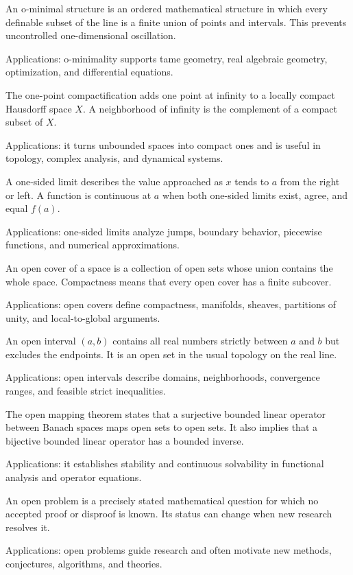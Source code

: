 An o-minimal structure is an ordered mathematical structure in which every definable subset of the line is a finite union of points and intervals. This prevents uncontrolled one-dimensional oscillation. \par\noindent Applications: o-minimality supports tame geometry, real algebraic geometry, optimization, and differential equations.

The one-point compactification adds one point at infinity to a locally compact Hausdorff space $X$. A neighborhood of infinity is the complement of a compact subset of $X$. \par\noindent Applications: it turns unbounded spaces into compact ones and is useful in topology, complex analysis, and dynamical systems.

A one-sided limit describes the value approached as $x$ tends to $a$ from the right or left. A function is continuous at $a$ when both one-sided limits exist, agree, and equal $f(a)$. \par\noindent Applications: one-sided limits analyze jumps, boundary behavior, piecewise functions, and numerical approximations.

An open cover of a space is a collection of open sets whose union contains the whole space. Compactness means that every open cover has a finite subcover. \par\noindent Applications: open covers define compactness, manifolds, sheaves, partitions of unity, and local-to-global arguments.

An open interval $(a,b)$ contains all real numbers strictly between $a$ and $b$ but excludes the endpoints. It is an open set in the usual topology on the real line. \par\noindent Applications: open intervals describe domains, neighborhoods, convergence ranges, and feasible strict inequalities.

The open mapping theorem states that a surjective bounded linear operator between Banach spaces maps open sets to open sets. It also implies that a bijective bounded linear operator has a bounded inverse. \par\noindent Applications: it establishes stability and continuous solvability in functional analysis and operator equations.

An open problem is a precisely stated mathematical question for which no accepted proof or disproof is known. Its status can change when new research resolves it. \par\noindent Applications: open problems guide research and often motivate new methods, conjectures, algorithms, and theories.

